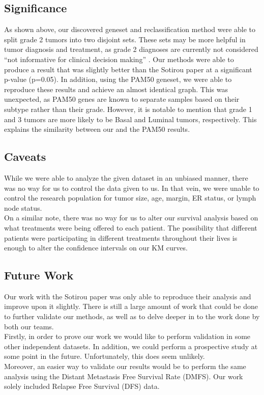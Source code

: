 \documentclass[a4paper,10pt]{article}
\begin{document}
\subsection{Significance}
As shown above, our discovered geneset and reclassification method were 
able to split grade 2 tumors into two disjoint sets. These sets may be more 
helpful in tumor diagnosis and treatment, as grade 2 diagnoses are currently
 not considered “not informative for clinical decision making” \cite{Sotiriou1}.
Our methods were able to produce a result that was slightly better than the 
Sotirou paper at a significant p-value (p=0.05). In addition, using the PAM50
 geneset, we were able to reproduce these results and achieve an almost 
identical graph. This was unexpected, as PAM50 genes are known to 
separate samples based on their subtype rather than their grade. However, 
it is notable to mention that grade 1 and 3 tumors are more likely to be Basal 
and Luminal tumors, respectively. This explains the similarity between our 
and the PAM50 results.
\subsection{Caveats}
While we were able to analyze the given dataset in an unbiased manner, 
there was no way for us to control the data given to us. In that vein, we 
were unable to control the research population for tumor size, age, 
margin, ER status, or lymph node status.\\

On a similar note, there was no way for us to alter our survival analysis 
based on what treatments were being offered to each patient. The 
possibility that different patients were participating in different treatments 
throughout their lives is enough to alter the confidence intervals on our KM 
curves.
\subsection{Future Work}
Our work with the Sotirou paper was only able to reproduce their analysis 
and improve upon it slightly. There is still a large amount of work that could 
be done to further validate our methods, as well as to delve deeper in to the 
work done by both our teams.\\

Firstly, in order to prove our work we would like to perform validation in
 some other independent datasets. In addition, we could perform a 
prospective study at some point in the future. Unfortunately, this does seem 
unlikely.\\

Moreover, an easier way to validate our results would be to perform the same 
analysis using the Distant Metastasis Free Survival Rate (DMFS). Our work 
solely included Relapse Free Survival (DFS) data.


 \markright{ }
\end{document}
